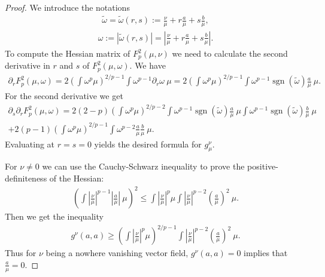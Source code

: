 \documentclass[11pt]{amsart}
\theoremstyle{definition}
\newcommand{\Abs}[1]{\left|#1\right|}
\begin{document}
\begin{proof}
We introduce the notations 
\begin{align*}
\tilde\omega=\tilde\omega(r,s):=\frac{\nu}{\mu}+r\frac{a}{\mu}+s\frac{b}{\mu},
\end{align*}
\begin{align*}
\omega:=|\tilde\omega(r,s)|=\left|\frac{\nu}{\mu}+r\frac{a}{\mu}+s\frac{b}{\mu}\right|.
\end{align*}
To compute the Hessian matrix of $F_p^2(\mu,\nu)$ we need to calculate the second derivative in $r$ and $s$ of $F_p^2(\mu,\omega)$.
We have
\begin{align*}
\partial_r F_p^2(\mu,\omega)= 2\left(\int\omega^p\mu\right)^{2/p-1} \int\omega^{p-1} \partial_r \omega \ \mu
=2            
\left(\int\omega^p\mu\right)^{2/p-1} \int\omega^{p-1} \operatorname{sgn} (\tilde\omega)\frac{a}{\mu} \ \mu.
\end{align*}
For the second derivative we get
\begin{multline*}
\partial_s \partial_r F_p^2(\mu,\omega)
=2(2-p)  \left(\int\omega^p\mu\right)^{2/p-2}  \int\omega^{p-1} \operatorname{sgn} (\tilde\omega)\frac{a}{\mu} \ \mu \int\omega^{p-1} \operatorname{sgn} (\tilde\omega)\frac{b}{\mu} \ \mu\\+
2(p-1) \left(\int\omega^p\mu\right)^{2/p-1} \int\omega^{p-2} \frac{a}{\mu} \frac{b}{\mu} \ \mu.
\end{multline*}  
Evaluating at $r=s=0$ yields the desired formula for $g^{\nu}_\mu$.

For $\nu\neq 0$ we can use the Cauchy-Schwarz inequality to prove the positive-definiteness of the Hessian:
\begin{align*}
\left(\int\Abs{\frac{\nu}{\mu}}^{p-1} \Abs{\frac{a}{\mu}} \ \mu\right)^2\leq \int\Abs{\frac{\nu}{\mu}}^p\mu \int\Abs{\frac{\nu}{\mu}}^{p-2} \left(\frac{a}{\mu}\right)^2 \ \mu.
\end{align*}
Then we get the inequality
\begin{align*}
g^{\nu}(a,a)\geq\left(\int\Abs{\frac{\nu}{\mu}}^p\mu\right)^{2/p-1} \int\Abs{\frac{\nu}{\mu}}^{p-2} \left(\frac{a}{\mu}\right)^2 \ \mu.
\end{align*}
Thus for $\nu$ being a nowhere vanishing vector field,
$g^{\nu}(a,a)=0$ implies that $\frac{a}{\mu}=0$.
\end{proof}
\end{document}
